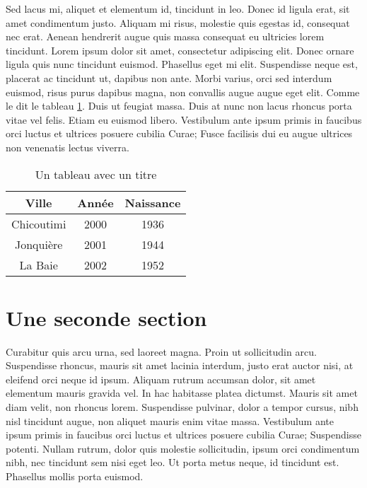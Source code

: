 Sed lacus mi, aliquet et elementum id, tincidunt in leo. Donec id ligula
erat, sit amet condimentum justo. Aliquam mi risus, molestie quis egestas
id, consequat nec erat. Aenean hendrerit augue quis massa consequat eu
ultricies lorem tincidunt. Lorem ipsum dolor sit amet, consectetur
adipiscing elit. Donec ornare ligula quis nunc tincidunt euismod. Phasellus
eget mi elit. Suspendisse neque est, placerat ac tincidunt ut, dapibus non
ante. Morbi varius, orci sed interdum euismod, risus purus dapibus magna,
non convallis augue augue eget elit. Comme le dit le tableau
\ref{tab:villes}. Duis ut feugiat massa. Duis at nunc non lacus rhoncus
porta vitae vel felis. Etiam eu euismod libero. Vestibulum ante ipsum primis
in faucibus orci luctus et ultrices posuere cubilia Curae; Fusce facilisis
dui eu augue ultrices non venenatis lectus viverra.

\begin{table}
  \caption{Un tableau avec un titre}
  \begin{center}
    \begin{tabular}{|c|c|c|}
      \hline
      Ville & Année & Naissance \\
      \hline\hline
      Chicoutimi & 2000 & 1936 \\
      \hline
      Jonquière & 2001 & 1944 \\
      \hline
      La Baie & 2002 & 1952 \\
      \hline
  \end{tabular}
  \label{tab:villes}
  \end{center}
\end{table}

\section{Une seconde section}

Curabitur quis arcu urna, sed laoreet magna. Proin ut sollicitudin arcu.
Suspendisse rhoncus, mauris sit amet lacinia interdum, justo erat auctor
nisi, at eleifend orci neque id ipsum. Aliquam rutrum accumsan dolor, sit
amet elementum mauris gravida vel. In hac habitasse platea dictumst. Mauris
sit amet diam velit, non rhoncus lorem. Suspendisse pulvinar, dolor a tempor
cursus, nibh nisl tincidunt augue, non aliquet mauris enim vitae massa.
Vestibulum ante ipsum primis in faucibus orci luctus et ultrices posuere
cubilia Curae; Suspendisse potenti. Nullam rutrum, dolor quis molestie
sollicitudin, ipsum orci condimentum nibh, nec tincidunt sem nisi eget leo.
Ut porta metus neque, id tincidunt est. Phasellus mollis porta euismod.

